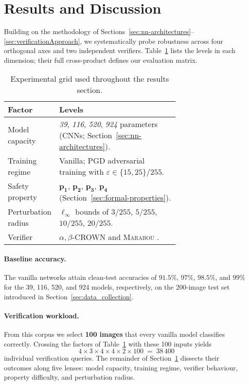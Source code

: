 \section{Results and Discussion}
\label{sec:results}

Building on the methodology of Sections~\ref{sec:nn-architectures}--\ref{sec:verificationApproach},
we systematically probe robustness across four orthogonal axes and two
independent verifiers.  
Table~\ref{tab:exp-grid} lists the levels in each dimension; their full
cross-product defines our evaluation matrix.

\begin{table}[h]
\centering
\caption{Experimental grid used throughout the results section.}
\label{tab:exp-grid}
\begin{tabular}{@{}lp{0.70\linewidth}@{}}
\toprule
\textbf{Factor} & \textbf{Levels} \\ \midrule
Model capacity & \textit{39}, \textit{116}, \textit{520}, \textit{924} parameters (CNNs; Section~\ref{sec:nn-architectures}). \\[2pt]
Training regime & Vanilla; PGD adversarial training with \(\varepsilon \in \{15,25\}/255\). \\[2pt]
Safety property & \(\mathbf{p_1}\), \(\mathbf{p_2}\), \(\mathbf{p_3}\), \(\mathbf{p_4}\) (Section~\ref{sec:formal-properties}). \\[2pt]
Perturbation radius & \(\ell_\infty\) bounds of \(3/255\), \(5/255\), \(10/255\), \(20/255\). \\[2pt]
Verifier & \(\alpha,\beta\)\textsc{-CROWN}  and \textsc{Marabou} . \\ \bottomrule
\end{tabular}
\end{table}

\paragraph{Baseline accuracy.}
The vanilla networks attain clean-test accuracies of
\(91.5\%\), \(97\%\), \(98.5\%\), and \(99\%\) for the 39, 116, 520, and 924 models,
respectively, on the 200-image test set introduced in
Section~\ref{sec:data_collection}. 

\paragraph{Verification workload.}
From this corpus we select
\textbf{100 images} that every vanilla model classifies correctly.
Crossing the factors of Table~\ref{tab:exp-grid} with these 100 inputs yields
\[
4 \times 3 \times 4 \times 4 \times 2 \times 100 \;=\; 38\,400
\]
individual verification queries.  
The remainder of Section~\ref{sec:results} dissects their outcomes along
five lenses: model capacity, training regime, verifier behaviour, property
difficulty, and perturbation radius.